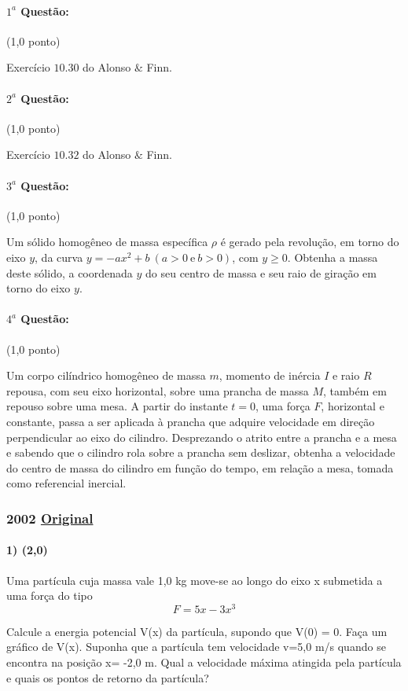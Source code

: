 \documentclass[12pt,a4paper]{article}
\newcommand{\original}[1]{\tiny \href{#1}{Original} \normalsize}
\begin{document}
\paragraph{$1^a$ Questão:} (1,0 ponto)

Exercício $10.30$ do Alonso $\&$ Finn.

\paragraph{$2^a$ Questão:} (1,0 ponto)

Exercício $10.32$ do Alonso $\&$ Finn.

\paragraph{$3^a$ Questão:} (1,0 ponto)

Um sólido homogêneo de massa específica $\rho$ é gerado pela revolução, em torno do eixo $y$, da curva $y=-ax^2+b \ (a>0 \ \textrm{e} \ b>0)$, com $y \geq 0$. Obtenha
a massa deste sólido, a coordenada $y$ do seu centro de massa e seu raio de giração em torno do eixo $y$.

\paragraph{$4^a$ Questão:} (1,0 ponto)

Um corpo cilíndrico homogêneo de massa $m$, momento de inércia $I$ e raio $R$ repousa, com seu eixo horizontal, sobre uma prancha de massa $M$, também em repouso sobre uma mesa. A partir
do instante $t=0$, uma força $F$, horizontal e constante, passa a ser aplicada à prancha que adquire velocidade em direção perpendicular ao eixo do cilindro. Desprezando o atrito entre a prancha e a mesa e sabendo que o cilindro 
rola sobre a prancha sem deslizar, obtenha a velocidade do centro de massa do cilindro em função do tempo, em relação a mesa, tomada como referencial inercial.

\newpage

\subsubsection{2002 \original{https://drive.google.com/open?id=1tepTtUD4Wowc0J89mcTBJcg7TE7NjEm_}}

\paragraph{1) (2,0)} Uma partícula cuja massa vale 1,0 kg move-se ao longo do eixo x submetida a uma força do tipo $$F=5x - 3x^3$$
\begin{tasks}
\task Calcule a energia potencial V(x) da partícula, supondo que V(0) = 0. Faça um gráfico de V(x).
\task Suponha que a partícula tem velocidade v=5,0 m/s quando se encontra na posição x= -2,0 m. Qual a velocidade máxima atingida pela partícula e quais os pontos de retorno da partícula?
\end{tasks}
\end{document}
